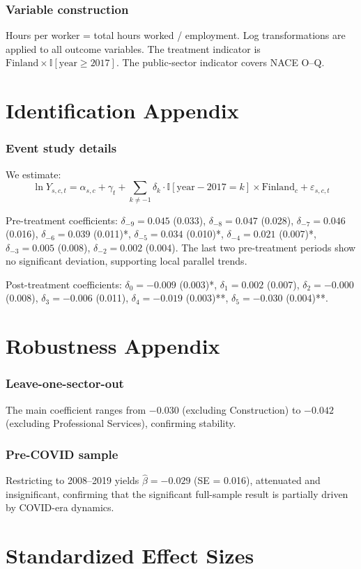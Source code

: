\documentclass[12pt]{article}
\newcommand{\ind}{\mathbb{I}}
\begin{document}
\subsubsection*{Variable construction} Hours per worker = total hours worked / employment. Log transformations are applied to all outcome variables. The treatment indicator is $\text{Finland} \times \ind[\text{year} \geq 2017]$. The public-sector indicator covers NACE O--Q.


\section{Identification Appendix}

\subsubsection*{Event study details} We estimate:
\begin{equation}
\ln Y_{s,c,t} = \alpha_{s,c} + \gamma_t + \sum_{k \neq -1} \delta_k \cdot \ind[\text{year} - 2017 = k] \times \text{Finland}_c + \varepsilon_{s,c,t}
\end{equation}

Pre-treatment coefficients: $\delta_{-9} = 0.045$ (0.033), $\delta_{-8} = 0.047$ (0.028), $\delta_{-7} = 0.046$ (0.016), $\delta_{-6} = 0.039$ (0.011)*, $\delta_{-5} = 0.034$ (0.010)*, $\delta_{-4} = 0.021$ (0.007)*, $\delta_{-3} = 0.005$ (0.008), $\delta_{-2} = 0.002$ (0.004). The last two pre-treatment periods show no significant deviation, supporting local parallel trends.

Post-treatment coefficients: $\delta_0 = -0.009$ (0.003)*, $\delta_1 = 0.002$ (0.007), $\delta_2 = -0.000$ (0.008), $\delta_3 = -0.006$ (0.011), $\delta_4 = -0.019$ (0.003)**, $\delta_5 = -0.030$ (0.004)**.


\section{Robustness Appendix}

\subsubsection*{Leave-one-sector-out} The main coefficient ranges from $-0.030$ (excluding Construction) to $-0.042$ (excluding Professional Services), confirming stability.

\subsubsection*{Pre-COVID sample} Restricting to 2008--2019 yields $\hat{\beta} = -0.029$ (SE = 0.016), attenuated and insignificant, confirming that the significant full-sample result is partially driven by COVID-era dynamics.


\section{Standardized Effect Sizes}
\label{sec:sde}


\end{document}
